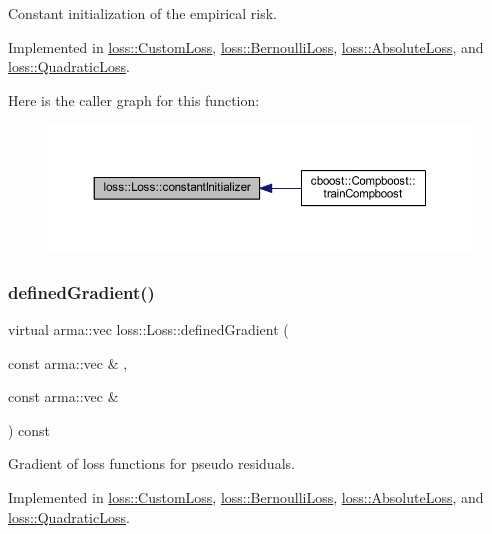 Constant initialization of the empirical risk. 



Implemented in \mbox{\hyperlink{classloss_1_1_custom_loss_adf283025a8511731504cd5b620cc8b37}{loss\+::\+Custom\+Loss}}, \mbox{\hyperlink{classloss_1_1_bernoulli_loss_a1b5e26f446f30d690abc625349f563d1}{loss\+::\+Bernoulli\+Loss}}, \mbox{\hyperlink{classloss_1_1_absolute_loss_aa2ac5fb1fdf3ce0f48decd77d375ef76}{loss\+::\+Absolute\+Loss}}, and \mbox{\hyperlink{classloss_1_1_quadratic_loss_a43989f3fbecc27351513afe1136cdf38}{loss\+::\+Quadratic\+Loss}}.

Here is the caller graph for this function\+:\nopagebreak
\begin{figure}[H]
\begin{center}
\leavevmode
\includegraphics[width=350pt]{classloss_1_1_loss_a65fe7dcd9370e6a549b8d1cc95fc8798_icgraph}
\end{center}
\end{figure}
\mbox{\label{classloss_1_1_loss_a267a4de70747ade4b2d84ce35a448979}} 
\subsubsection{\texorpdfstring{defined\+Gradient()}{definedGradient()}}
{\footnotesize\ttfamily virtual arma\+::vec loss\+::\+Loss\+::defined\+Gradient (\begin{DoxyParamCaption}\item[{const arma\+::vec \&}]{,  }\item[{const arma\+::vec \&}]{ }\end{DoxyParamCaption}) const\hspace{0.3cm}{\ttfamily [pure virtual]}}



Gradient of loss functions for pseudo residuals. 



Implemented in \mbox{\hyperlink{classloss_1_1_custom_loss_a3a79dc019e781c2956b52fb8e1cfcc56}{loss\+::\+Custom\+Loss}}, \mbox{\hyperlink{classloss_1_1_bernoulli_loss_a2dc644172cea3eb84f1af5aa9217c04a}{loss\+::\+Bernoulli\+Loss}}, \mbox{\hyperlink{classloss_1_1_absolute_loss_a1886fc8ca065c6f0a207b7a8a0f8444d}{loss\+::\+Absolute\+Loss}}, and \mbox{\hyperlink{classloss_1_1_quadratic_loss_adb4da1acbad702b5ba8570abaa17d373}{loss\+::\+Quadratic\+Loss}}.

